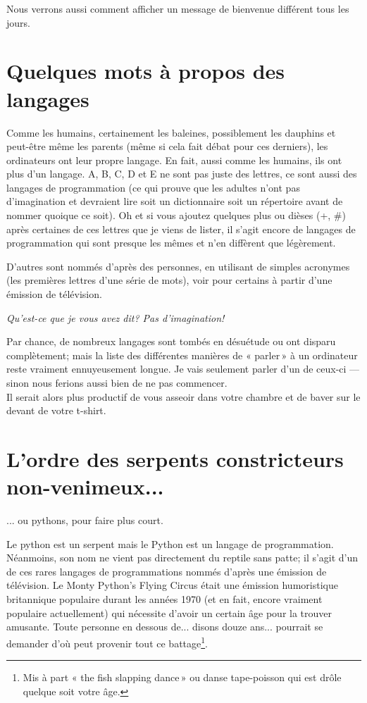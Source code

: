Nous verrons aussi comment afficher un message de bienvenue différent tous les jours.

\section{Quelques mots à propos des langages}
Comme les humains, certainement les baleines, possiblement les dauphins et peut-être même les parents (même si cela fait débat pour ces derniers), les ordinateurs ont leur propre langage. En fait, aussi comme les humains, ils ont plus d'un langage. A, B, C, D et E ne sont pas juste des lettres, ce sont aussi des langages de programmation (ce qui prouve que les adultes n'ont pas d'imagination et devraient lire soit un dictionnaire soit un répertoire avant de nommer quoique ce soit). Oh et si vous ajoutez quelques plus ou dièses (+, \#) après certaines de ces lettres que je viens de lister, il s'agit encore de langages de programmation qui sont presque les mêmes et n'en diffèrent que légèrement.

D'autres sont nommés d'après des personnes, en utilisant de simples acronymes (les premières lettres d'une série de mots), voir pour certains à partir d'une émission de télévision. 

\bigskip
\emph{Qu'est-ce que je vous avez dit? Pas d'imagination!}

\bigskip
Par chance, de nombreux langages sont tombés en désuétude ou ont disparu complètement; mais la liste des différentes manières de « parler » à un ordinateur reste vraiment ennuyeusement longue. Je vais seulement parler d'un de ceux-ci --- sinon nous ferions aussi bien de ne pas commencer.\\


Il serait alors plus productif de vous asseoir dans votre chambre et de baver sur le devant de votre t-shirt.

\section{L'ordre des serpents constricteurs non-venimeux...}
... ou pythons, pour faire plus court.

\bigskip
Le python est un serpent mais le Python est un langage de programmation. Néanmoins, son nom ne vient pas directement du reptile sans patte; il s'agit d'un de ces rares langages de programmations nommés d'après une émission de télévision. Le Monty Python's Flying Circus était une émission humoristique britannique populaire durant les années 1970 (et en fait, encore vraiment populaire actuellement) qui nécessite d'avoir un certain âge pour la trouver amusante. Toute personne en dessous de... disons douze ans... pourrait se demander d'où peut provenir tout ce battage\footnote{Mis à part « the fish slapping dance » ou danse tape-poisson qui est drôle quelque soit votre âge.}.


